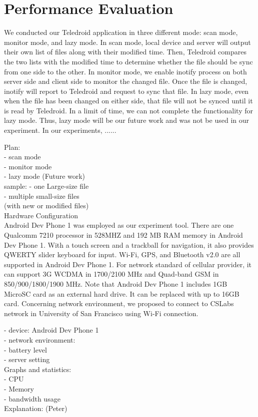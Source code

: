 \section{Performance Evaluation}
\label{sec:Performance}
We conducted our Teledroid application in three different mode: scan mode, monitor mode, and lazy mode. In scan mode, local device and server will output their own list of files along with their modified time. Then, Teledroid compares the two lists with the modified time to determine whether the file should be sync from one side to the other. In monitor mode, we enable inotify process on both server side and client side to monitor the changed file. Once the file is changed, inotify will report to Teledroid and request to sync that file. In lazy mode, even when the file has been changed on either side, that file will not be synced until it is read by Teledroid. In a limit of time, we can not complete the functionality for lazy mode. Thus, lazy mode will be our future work and was not be used in our experiment.
In our experiments, ......

Plan:\\
	- scan mode\\
	- monitor mode\\
	- lazy mode (Future work)\\
	
	sample:	
		- one Large-size file\\
		- multiple small-size files\\
		(with new or modified files)\\
		
Hardware Configuration\\

Android Dev Phone 1 was employed as our experiment tool. There are one Qualcomm 7210 processor in 528MHZ and 192 MB RAM memory in Android Dev Phone 1. With a touch screen and a trackball for navigation, it also provides QWERTY slider keyboard for input. Wi-Fi, GPS,  and Bluetooth v2.0 are all supported in Android Dev Phone 1. For network standard of cellular provider, it can support 3G WCDMA in 1700/2100 MHz and Quad-band GSM in 850/900/1800/1900 MHz. Note that Android Dev Phone 1 includes 1GB MicroSC card as an external hard drive. It can be replaced with up to 16GB card.
Concerning network environment, we proposed to connect to CSLabs network in University of San Francisco using Wi-Fi connection.

	- device: Android Dev Phone 1\\
	- network environment:\\
	- battery level\\
	- server setting\\

Graphs and statistics:\\ 
	- CPU\\
	- Memory\\
	- bandwidth usage\\

Explanation:  (Peter)\\
